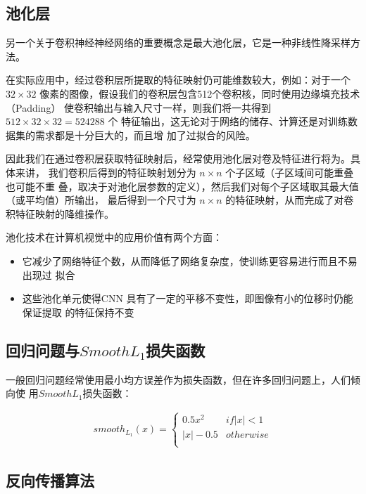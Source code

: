 \subsection{池化层}

另一个关于卷积神经神经网络的重要概念是最大池化层，它是一种非线性降采样方法。

在实际应用中，经过卷积层所提取的特征映射仍可能维数较大，例如：对于一个 $32 \times
32$ 像素的图像，假设我们的卷积层包含512个卷积核，同时使用边缘填充技术（Padding）
使卷积输出与输入尺寸一样，则我们将一共得到 $512 \times 32 \times 32 = 524288$ 个
特征输出，这无论对于网络的储存、计算还是对训练数据集的需求都是十分巨大的，而且增
加了过拟合的风险。

因此我们在通过卷积层获取特征映射后，经常使用池化层对卷及特征进行将为。具体来讲，
我们卷积后得到的特征映射划分为 $n \times n$ 个子区域（子区域间可能重叠也可能不重
叠，取决于对池化层参数的定义），然后我们对每个子区域取其最大值（或平均值）所输出，
最后得到一个尺寸为 $n \times n$ 的特征映射，从而完成了对卷积特征映射的降维操作。

池化技术在计算机视觉中的应用价值有两个方面：

\begin{itemize}
\item 它减少了网络特征个数，从而降低了网络复杂度，使训练更容易进行而且不易出现过
  拟合
\item 这些池化单元使得CNN 具有了一定的平移不变性，即图像有小的位移时仍能保证提取
  的特征保持不变
\end{itemize}

\subsection{回归问题与$Smooth L_1$损失函数}

一般回归问题经常使用最小均方误差作为损失函数，但在许多回归问题上，人们倾向使
用$Smooth L_1$损失函数：

\begin{align}
smooth_{L_1}(x) = 
\begin{cases}
0.5x^2 & if |x| < 1 \\
|x| - 0.5 & otherwise \\
\end{cases}
\end{align}

\subsection{反向传播算法}


